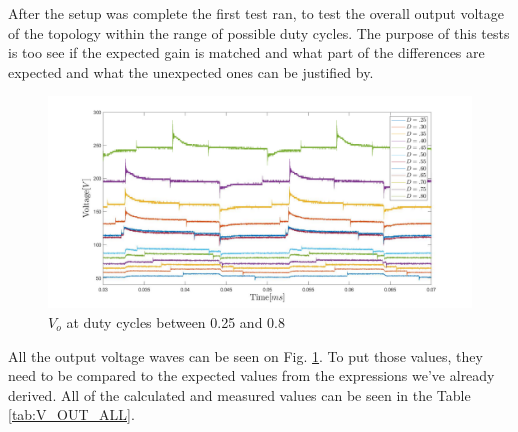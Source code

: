 After the setup was complete the first test ran, to test the overall output voltage of the topology within the range of possible duty cycles. The purpose of this tests is too see if the expected gain is matched and what part of the differences are expected and what the unexpected ones can be justified by. 
\vspace{-4mm}

\begin{figure}[H]
	\begin{center}
   \includegraphics[width=\textwidth]{figures/06Testing/Vripple10Vin.pdf}
	\end{center}
	\vspace{-8mm}
	\caption{$V_o$ at duty cycles between 0.25 and 0.8}
	\label{fig:V_OUT_ALL}
\end{figure}
\vspace{-4mm}
All the output voltage waves can be seen on Fig. \ref{fig:V_OUT_ALL}. To put those values, they need to be compared to the expected values from the expressions we've already derived. All of the calculated and measured values can be seen in the Table \ref{tab:V_OUT_ALL}.
\vspace{-2mm}

